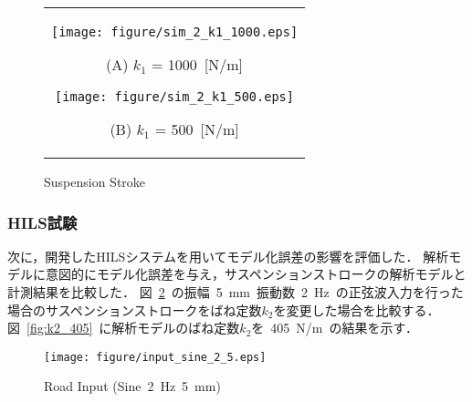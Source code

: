 \documentclass[a4paper,12pt]{article_vdlab_sotsuron}
\begin{document}
\vspace{15mm}
\begin{figure}[h]
    \begin{tabular}{c}
      \begin{minipage}{0.45\hsize}
	\begin{center}
	  \texttt{[image: figure/sim\_2\_k1\_1000.eps]}
	\end{center}
	\begin{center}
	  \vspace{2mm}
	  \ (A) $k_1$ = 1000~[N/m]\
	  \end{center}
      \end{minipage}
      \begin{minipage}{0.5\hsize}
	\begin{center}
	  \texttt{[image: figure/sim\_2\_k1\_500.eps]}
	\end{center}
	\begin{center}
	  \vspace{2mm}
	  \ (B) $k_1$ = 500~[N/m]\
	  \end{center}
      \end{minipage}
    \end{tabular}
    \vspace{2mm}
    \caption{Suspension Stroke}
    \label{fig:sim_k1_s1}
\end{figure}


\newpage
\subsubsection{HILS試験}
次に，開発したHILSシステムを用いてモデル化誤差の影響を評価した．
解析モデルに意図的にモデル化誤差を与え，サスペンションストロークの解析モデルと計測結果を比較した．
図~\ref{fig:2_5}~の振幅~5~mm~振動数~2~Hz~の正弦波入力を行った場合のサスペンションストロークをばね定数$k_2$を変更した場合を比較する．
図~\ref{fig:k2_405}~に解析モデルのばね定数$k_2$を~405~N/m~の結果を示す．


\vspace{15mm}
\begin{figure}[h]
  \centering
   \texttt{[image: figure/input\_sine\_2\_5.eps]}
  \vspace{2mm}
\caption{Road Input (Sine~2~Hz~5~mm)}
  \label{fig:2_5}
\end{figure}
\end{document}

